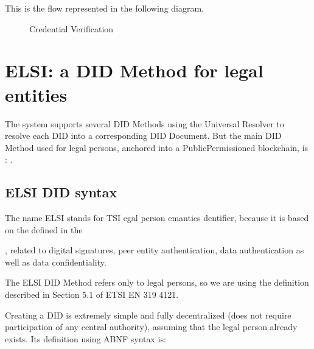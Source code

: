 \documentclass[a4paper,12pt,english,openany]{sphinxmanual}
\begin{document}
\sphinxAtStartPar
This is the flow represented in the following diagram.

\begin{figure}[htbp]
\centering
\capstart

\noindent{}
\caption{Credential Verification}\label{\detokenize{privacycred:id7}}\end{figure}


\section{ELSI: a DID Method for legal entities}
\label{\detokenize{privacycred:elsi-a-did-method-for-legal-entities}}
\sphinxAtStartPar
The system supports several DID Methods using the Universal Resolver to resolve each DID into a corresponding DID Document.
But the main DID Method used for legal persons, anchored into a Public\sphinxhyphen{}Permissioned blockchain, is : .


\subsection{ELSI DID syntax}
\label{\detokenize{privacycred:elsi-did-syntax}}
\sphinxAtStartPar
The name ELSI stands for TSI egal person emantics dentifier, because it is based on the  defined in the %
\begin{footnote}[5]\sphinxAtStartFootnote
{}
%
\end{footnote}, related to digital signatures, peer entity authentication, data authentication as well as data confidentiality.

\sphinxAtStartPar
The ELSI DID Method refers only to legal persons, so we are using the  definition described in Section 5.1 of ETSI EN 319 412\sphinxhyphen{}1.

\sphinxAtStartPar
Creating a DID is extremely simple and fully decentralized (does not require participation of any central authority), assuming that the legal person already exists. Its definition using ABNF syntax is:
\end{document}
